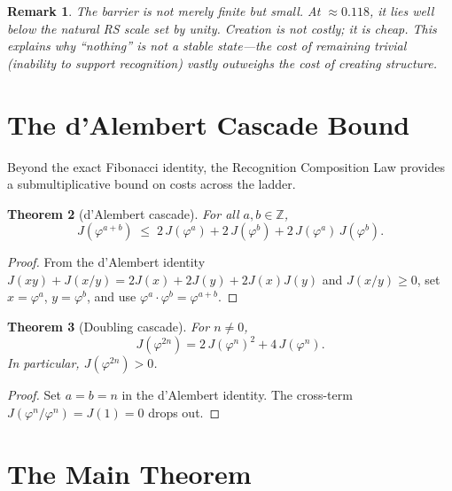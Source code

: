 \documentclass[11pt,a4paper]{article}
\newcommand{\Jcost}{J}
\newcommand{\phirs}{\varphi}
\newtheorem{theorem}{Theorem}[section]
\newtheorem{remark}[theorem]{Remark}
\begin{document}
\begin{remark}
The barrier is not merely finite but \emph{small}.  At $\approx 0.118$, it lies well below the natural RS scale set by unity.  Creation is not costly; it is cheap.  This explains why ``nothing'' is not a stable state---the cost of remaining trivial (inability to support recognition) vastly outweighs the cost of creating structure.
\end{remark}

\section{The d'Alembert Cascade Bound}
\label{sec:dalembert}

Beyond the exact Fibonacci identity, the Recognition Composition Law provides a submultiplicative bound on costs across the ladder.

\begin{theorem}[d'Alembert cascade]
\label{thm:dalembert}
For all $a,b\in\mathbb Z$,
\begin{equation}
  \Jcost(\phirs^{a+b}) \;\leq\; 2\,\Jcost(\phirs^a) + 2\,\Jcost(\phirs^b) + 2\,\Jcost(\phirs^a)\,\Jcost(\phirs^b).
  \label{eq:dalembert_bound}
\end{equation}
\end{theorem}
\begin{proof}
From the d'Alembert identity $\Jcost(xy)+\Jcost(x/y)=2\Jcost(x)+2\Jcost(y)+2\Jcost(x)\Jcost(y)$ and $\Jcost(x/y)\geq 0$, set $x=\phirs^a$, $y=\phirs^b$, and use $\phirs^a\cdot\phirs^b=\phirs^{a+b}$.
\end{proof}

\begin{theorem}[Doubling cascade]
\label{thm:doubling}
For $n\neq 0$,
\[
  \Jcost(\phirs^{2n}) = 2\,\Jcost(\phirs^n)^2 + 4\,\Jcost(\phirs^n).
\]
In particular, $\Jcost(\phirs^{2n})>0$.
\end{theorem}
\begin{proof}
Set $a=b=n$ in the d'Alembert identity.  The cross-term $\Jcost(\phirs^n/\phirs^n)=\Jcost(1)=0$ drops out.
\end{proof}

\section{The Main Theorem}
\label{sec:main}
\end{document}
